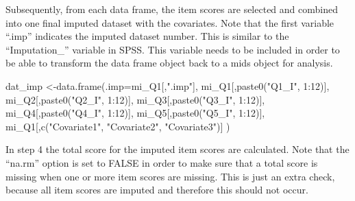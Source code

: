 \documentclass[
]{book}
\newenvironment{Shaded}{\begin{snugshade}}{\end{snugshade}}
\newcommand{\AttributeTok}[1]{\textcolor[rgb]{0.77,0.63,0.00}{#1}}
\newcommand{\DecValTok}[1]{\textcolor[rgb]{0.00,0.00,0.81}{#1}}
\newcommand{\FunctionTok}[1]{\textcolor[rgb]{0.00,0.00,0.00}{#1}}
\newcommand{\NormalTok}[1]{#1}
\newcommand{\OtherTok}[1]{\textcolor[rgb]{0.56,0.35,0.01}{#1}}
\newcommand{\SpecialCharTok}[1]{\textcolor[rgb]{0.00,0.00,0.00}{#1}}
\newcommand{\StringTok}[1]{\textcolor[rgb]{0.31,0.60,0.02}{#1}}
\begin{document}
Subsequently, from each data frame, the item scores are selected and combined into one final imputed dataset with the covariates. Note that the first variable ``.imp'' indicates the imputed dataset number. This is similar to the ``Imputation\_'' variable in SPSS. This variable needs to be included in order to be able to transform the data frame object back to a mids object for analysis.

\begin{Shaded}
\begin{Highlighting}[]
\NormalTok{dat\_imp }\OtherTok{\textless{}{-}}\FunctionTok{data.frame}\NormalTok{(}\AttributeTok{.imp=}\NormalTok{mi\_Q1[,}\StringTok{".imp"}\NormalTok{],}
\NormalTok{                        mi\_Q1[,}\FunctionTok{paste0}\NormalTok{(}\StringTok{"Q1\_I"}\NormalTok{, }\DecValTok{1}\SpecialCharTok{:}\DecValTok{12}\NormalTok{)],}
\NormalTok{                        mi\_Q2[,}\FunctionTok{paste0}\NormalTok{(}\StringTok{"Q2\_I"}\NormalTok{, }\DecValTok{1}\SpecialCharTok{:}\DecValTok{12}\NormalTok{)],}
\NormalTok{                        mi\_Q3[,}\FunctionTok{paste0}\NormalTok{(}\StringTok{"Q3\_I"}\NormalTok{, }\DecValTok{1}\SpecialCharTok{:}\DecValTok{12}\NormalTok{)],}
\NormalTok{                        mi\_Q4[,}\FunctionTok{paste0}\NormalTok{(}\StringTok{"Q4\_I"}\NormalTok{, }\DecValTok{1}\SpecialCharTok{:}\DecValTok{12}\NormalTok{)],}
\NormalTok{                        mi\_Q5[,}\FunctionTok{paste0}\NormalTok{(}\StringTok{"Q5\_I"}\NormalTok{, }\DecValTok{1}\SpecialCharTok{:}\DecValTok{12}\NormalTok{)],}
\NormalTok{                        mi\_Q1[,}\FunctionTok{c}\NormalTok{(}\StringTok{"Covariate1"}\NormalTok{, }\StringTok{"Covariate2"}\NormalTok{, }\StringTok{"Covariate3"}\NormalTok{)]}
\NormalTok{                        )}
\end{Highlighting}
\end{Shaded}

In step 4 the total score for the imputed item scores are calculated. Note that the ``na.rm'' option is set to FALSE in order to make sure that a total score is missing when one or more item scores are missing. This is just an extra check, because all item scores are imputed and therefore this should not occur.
\end{document}
